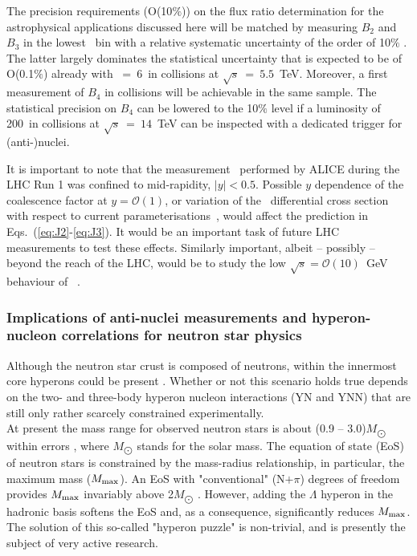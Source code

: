 %
The precision requirements (O(10$\%$)) on the flux ratio determination for the astrophysical applications discussed here will be matched by measuring $B_{2}$ and $B_{3}$ in the lowest \pT\ bin with a relative systematic uncertainty of the order of 10$\%$ \cite{Acharya:2017fvb}. The latter largely dominates the statistical uncertainty that is expected to be of O(0.1$\%$)  already with \Lint~=~6~\pbInv in \pp collisions at $\sqrt{s}~=~5.5$~TeV. 
Moreover, a first measurement of $B_{4}$ in \pp collisions will be achievable in the same sample. The statistical precision on $B_{4}$ can be lowered to the 10$\%$ level if a luminosity of 200~\pbInv in \pp collisions at $\sqrt{s}~=~14$~TeV can be inspected with a dedicated trigger for (anti-)nuclei.

It is important to note that the \BA measurement~\cite{Acharya:2017fvb} performed by ALICE during the LHC Run 1 was confined to mid-rapidity, $|y|<0.5$. Possible $y$ dependence of the coalescence factor \BA at $y=\mathcal{O}(1)$, or variation of the \antip\ differential cross section with respect to current parameterisations~\cite{Donato:2017ywo}, would affect the prediction in Eqs.~(\ref{eq:J2}-\ref{eq:J3}). It would be an important task of future LHC measurements to test these effects. Similarly important, albeit -- possibly -- beyond the reach of the LHC, would be to study the low $\sqrt{s}=\mathcal{O}(10)$~GeV behaviour of \BA~\cite{Blum:2017qnn}.

\subsubsection{Implications of anti-nuclei measurements and hyperon-nucleon correlations for neutron star physics}

Although the neutron star crust is composed of neutrons, within the innermost core hyperons could be present \cite{RMP-88-035004-2016}.
Whether or not this scenario holds true depends on the two- and three-body hyperon nucleon interactions (YN and YNN) that are still only rather scarcely constrained experimentally.\\
At present the mass range for observed neutron stars is about (0.9 --  3.0)$M_{\bigodot}$ within errors \cite{ARNPS-62-485-2012}, where $M_{\bigodot}$ stands for the solar mass. 
The equation of state (EoS) of neutron stars is constrained by the mass-radius relationship, in particular, the maximum mass ($M_{\scriptsize{\mbox{max}}}$). An EoS with "conventional" (N$+\pi$) degrees of freedom provides $M_{\scriptsize{\mbox{max}}}$ invariably above 2$M_{\bigodot}$ \cite{HyperfineInteract-233-131-2015,Nature-467-1081-2010,AstrophysJ-832-167-2016}. 
However, adding the $\Lambda$ hyperon in the hadronic basis softens the EoS and, as a consequence, significantly reduces $M_{\scriptsize{\mbox{max}}}$. 
The solution of this so-called "hyperon puzzle" is non-trivial, and is presently the subject of very active research.

